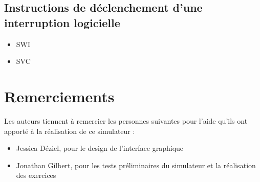 \documentclass{tufte-handout}
\begin{document}
\subsection{Instructions de déclenchement d'une interruption logicielle}
\begin{itemize}
	\item SWI
	\item SVC
\end{itemize}

\section{Remerciements}

Les auteurs tiennent à remercier les personnes suivantes pour l'aide qu'ils ont apporté à la réalisation de ce simulateur :
\begin{itemize}
	\item Jessica Déziel, pour le design de l'interface graphique
	\item Jonathan Gilbert, pour les tests préliminaires du simulateur et la réalisation des exercices
\end{itemize}
\end{document}
